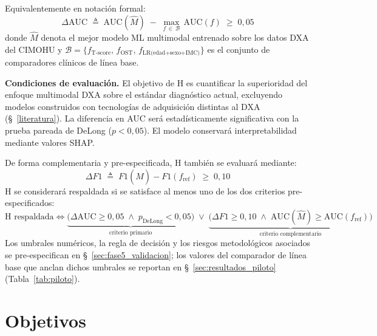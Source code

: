 \documentclass[../tesis.tex]{subfiles}
\begin{document}
\noindent Equivalentemente en notación formal:
\begin{equation}
  \label{eq:hipotesis}
  \Delta\text{AUC}
  \;\triangleq\;
  \text{AUC}(\hat{M}) \;-\; \max_{f \,\in\, \mathcal{B}}\,\text{AUC}(f)
  \;\geq\; 0{,}05
\end{equation}
donde $\hat{M}$ denota el mejor modelo ML multimodal entrenado sobre los datos DXA del CIMOHU y $\mathcal{B} = \{f_{\text{T-score}},\, f_{\text{OST}},\, f_{\text{LR(edad+sexo+IMC)}}\}$ es el conjunto de comparadores clínicos de línea base.

\medskip
\textbf{Condiciones de evaluación.} El objetivo de H es cuantificar la superioridad del enfoque multimodal DXA sobre el estándar diagnóstico actual, excluyendo modelos construidos con tecnologías de adquisición distintas al DXA (§~\ref{literatura}). La diferencia en AUC será estadísticamente significativa con la prueba pareada de DeLong \parencite{DeLong1988} ($p < 0{,}05$). El modelo conservará interpretabilidad mediante valores SHAP\@.

De forma complementaria y pre-especificada, H también se evaluará mediante:
\begin{equation}
  \label{eq:criterio_f1}
  \Delta F1 \;\triangleq\; F1(\hat{M}) - F1(f_{\text{ref}}) \;\geq\; 0{,}10
\end{equation}
H se considerará respaldada si se satisface al menos uno de los dos criterios pre-especificados:
\begin{equation}
  \label{eq:regla_decision}
  \text{H respaldada} \iff
  \underbrace{\bigl(\Delta\text{AUC} \geq 0{,}05 \;\wedge\; p_{\text{DeLong}} < 0{,}05\bigr)}_{\text{criterio primario}}
  \;\vee\;
  \underbrace{\bigl(\Delta F1 \geq 0{,}10 \;\wedge\; \text{AUC}(\hat{M}) \geq \text{AUC}(f_{\text{ref}})\bigr)}_{\text{criterio complementario}}
\end{equation}
Los umbrales numéricos, la regla de decisión y los riesgos metodológicos asociados se pre-especifican en §~\ref{sec:fase5_validacion}; los valores del comparador de línea base que anclan dichos umbrales se reportan en §~\ref{sec:resultados_piloto} (Tabla~\ref{tab:piloto}).

\section{Objetivos}
\label{objectives}
\end{document}
